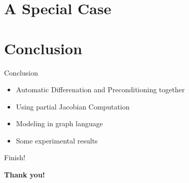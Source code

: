 \documentclass{beamer}
\begin{document}
\section{A Special Case}
\section{Conclusion}
\begin{frame}{Conclusion}
\begin{itemize}
\item Automatic Differenation and Preconditioning together
\item Using partial Jacobian Computation
\item Modeling in graph language
\item Some experimental results
\end{itemize}
\end{frame}

\begin{frame}{Finish!}
\begin{center}
   \Huge \bf Thank you!
\end{center}
\end{frame}
\end{document}
